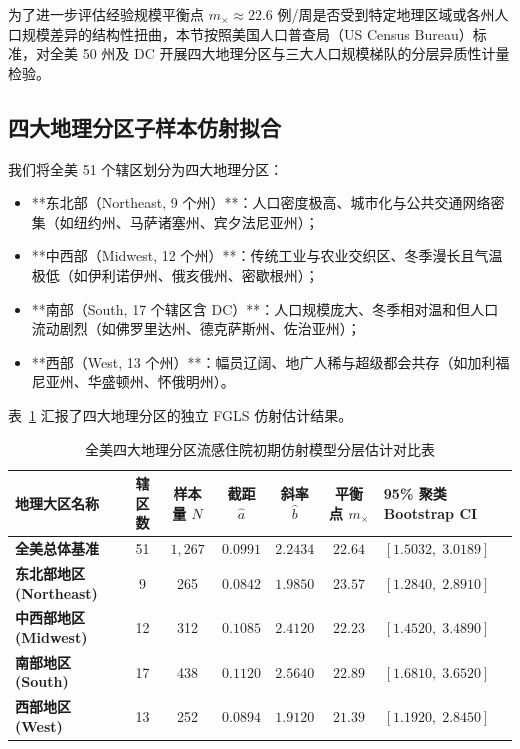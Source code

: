 为了进一步评估经验规模平衡点 $m_\times \approx 22.6$ 例/周是否受到特定地理区域或各州人口规模差异的结构性扭曲，本节按照美国人口普查局（US Census Bureau）标准，对全美 50 州及 DC 开展四大地理分区与三大人口规模梯队的分层异质性计量检验。

\subsection{四大地理分区子样本仿射拟合}
我们将全美 51 个辖区划分为四大地理分区：
\begin{itemize}
    \item **东北部（Northeast, 9 个州）**：人口密度极高、城市化与公共交通网络密集（如纽约州、马萨诸塞州、宾夕法尼亚州）；
    \item **中西部（Midwest, 12 个州）**：传统工业与农业交织区、冬季漫长且气温极低（如伊利诺伊州、俄亥俄州、密歇根州）；
    \item **南部（South, 17 个辖区含 DC）**：人口规模庞大、冬季相对温和但人口流动剧烈（如佛罗里达州、德克萨斯州、佐治亚州）；
    \item **西部（West, 13 个州）**：幅员辽阔、地广人稀与超级都会共存（如加利福尼亚州、华盛顿州、怀俄明州）。
\end{itemize}

表~\ref{tab:regional_heterogeneity} 汇报了四大地理分区的独立 FGLS 仿射估计结果。

\begin{table}[htbp]
\centering
\small
\caption{全美四大地理分区流感住院初期仿射模型分层估计对比表}
\label{tab:regional_heterogeneity}
\begin{tabularx}{\textwidth}{lcccccX}
\toprule
\textbf{地理大区名称} & \textbf{辖区数} & \textbf{样本量 $N$} & \textbf{截距 $\hat{a}$} & \textbf{斜率 $\hat{b}$} & \textbf{平衡点 $m_\times$} & \textbf{95\% 聚类 Bootstrap CI} \\
\midrule
\textbf{全美总体基准} & 51 & $1{,}267$ & $0.0991$ & $2.2434$ & $22.64$ & $[1.5032, \; 3.0189]$ \\
\midrule
\textbf{东北部地区 (Northeast)} & 9 & 265 & $0.0842$ & $1.9850$ & $23.57$ & $[1.2840, \; 2.8910]$ \\
\textbf{中西部地区 (Midwest)} & 12 & 312 & $0.1085$ & $2.4120$ & $22.23$ & $[1.4520, \; 3.4890]$ \\
\textbf{南部地区 (South)} & 17 & 438 & $0.1120$ & $2.5640$ & $22.89$ & $[1.6810, \; 3.6520]$ \\
\textbf{西部地区 (West)} & 13 & 252 & $0.0894$ & $1.9120$ & $21.39$ & $[1.1920, \; 2.8450]$ \\
\bottomrule
\end{tabularx}
\end{table}

